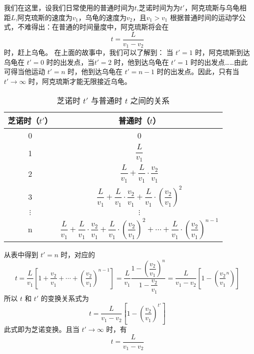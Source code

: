 我们在这里，设我们日常使用的普通时间为$t$,芝诺时间为为$t'$，阿克琉斯与乌龟相距$L$,阿克琉斯的速度为$v_1$，乌龟的速度为$v_2$，且$v_1>v_1$
根据普通时间的运动学公式，不难得出：在普通的时间量度中，阿克琉斯将会在
\begin{equation}
t = \dfrac{L}{v_1 - v_2}
\end{equation}
时，赶上乌龟。
在上面的故事中，我们可以了解到：
当 $t'=1$ 时，阿克琉斯到达乌龟在 $t'=0$ 时的出发点，当$t'=2$ 时，他到达乌龟在 $t'=1$ 时的出发点……由此可得当他运动 $t'=n$ 时，他到达乌龟在 $t'=n-1$ 时的出发点。因此，只有当 $t'\to\infty$ 时，阿克琉斯才能无限接近乌龟。\begin{table}[ht]
\centering
\caption{芝诺时 $t'$ 与普通时 $t$ 之间的关系}\label{tab_zeno_1}
\begin{tabular}{|c|c|}
\hline
芝诺时（$t'$） & 普通时（$t$） \\
\hline
0 & 0 \\
\hline
1 & $\dfrac{L}{v_1}$ \\
\hline
2 & $\dfrac{L}{v_1}+\dfrac{L}{v_1}\cdot\dfrac{v_2}{v_1}$ \\
\hline
3 & $\dfrac{L}{v_1}+\dfrac{L}{v_1}\cdot\dfrac{v_2}{v_1}+\dfrac{L}{v_1}\cdot(\dfrac{v_2}{v_1})^2$ \\
\hline
$\vdots$ & $\vdots$ \\
\hline
n & $\dfrac{L}{v_1}+\dfrac{L}{v_1}\cdot\dfrac{v_2}{v_1}+\dfrac{L}{v_1}\cdot(\dfrac{v_2}{v_1})^2+\cdots+\dfrac{L}{v_1}\cdot(\dfrac{v_2}{v_1})^{n-1}$ \\
\hline
\end{tabular}
\end{table}
从表中得到 $t'=n$ 时，对应的
\begin{equation}
t=\dfrac{L}{v_1}[1+\dfrac{v_2}{v_1}+\cdots+(\dfrac{v_2}{v_1})^{n-1}]=\dfrac{L}{v_1}\dfrac{1-(\dfrac{v_2}{v_1})^n}{1-\dfrac{v_2}{v_1}}=\dfrac{L}{v_1-v_2}[1-(\dfrac{v_2}{v_1}^n)]
\end{equation}
所以 $t$ 和 $t'$ 的变换关系式为
\begin{equation}
t=\dfrac{L}{v_1-v_2}[1-(\dfrac{v_2}{v_1})^{t'}]
\end{equation}
此式即为芝诺变换。且当 $t'\to\infty$ 时，有
\begin{equation}
t=\dfrac{L}{v_1-v_2}
\end{equation}
